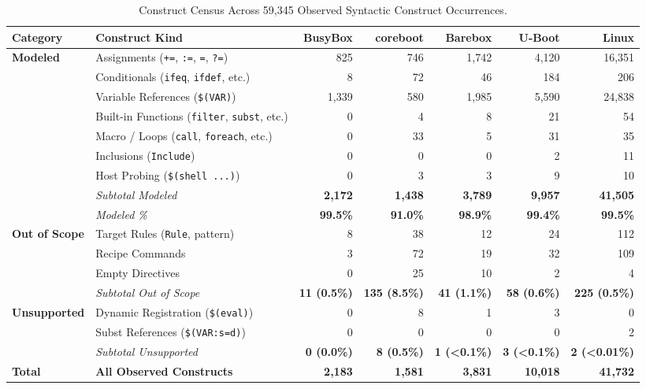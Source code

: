 \documentclass[acmsmall,screen,review]{acmart}
\begin{document}
\begin{table}[t]
\centering
\footnotesize
\setlength{\tabcolsep}{3pt}
\caption{Construct Census Across 59,345 Observed Syntactic Construct Occurrences.}
\label{tab:rq2}
\begin{tabular}{llrrrrr}
\toprule
\textbf{Category} & \textbf{Construct Kind} & \textbf{BusyBox} & \textbf{coreboot} & \textbf{Barebox} & \textbf{U-Boot} & \textbf{Linux} \\
\midrule
\textbf{Modeled} & Assignments (\texttt{+=}, \texttt{:=}, \texttt{=}, \texttt{?=}) & 825 & 746 & 1,742 & 4,120 & 16,351 \\
& Conditionals (\texttt{ifeq}, \texttt{ifdef}, etc.) & 8 & 72 & 46 & 184 & 206 \\
& Variable References (\texttt{\$(VAR)}) & 1,339 & 580 & 1,985 & 5,590 & 24,838 \\
& Built-in Functions (\texttt{filter}, \texttt{subst}, etc.) & 0 & 4 & 8 & 21 & 54 \\
& Macro / Loops (\texttt{call}, \texttt{foreach}, etc.) & 0 & 33 & 5 & 31 & 35 \\
& Inclusions (\texttt{Include}) & 0 & 0 & 0 & 2 & 11 \\
& Host Probing (\texttt{\$(shell ...)}) & 0 & 3 & 3 & 9 & 10 \\
\cmidrule(lr){2-7}
& \emph{Subtotal Modeled} & \textbf{2,172} & \textbf{1,438} & \textbf{3,789} & \textbf{9,957} & \textbf{41,505} \\
& \emph{Modeled \%} & \textbf{99.5\%} & \textbf{91.0\%} & \textbf{98.9\%} & \textbf{99.4\%} & \textbf{99.5\%} \\
\midrule
\textbf{Out of Scope} & Target Rules (\texttt{Rule}, pattern) & 8 & 38 & 12 & 24 & 112 \\
& Recipe Commands & 3 & 72 & 19 & 32 & 109 \\
& Empty Directives & 0 & 25 & 10 & 2 & 4 \\
\cmidrule(lr){2-7}
& \emph{Subtotal Out of Scope} & \textbf{11 (0.5\%)} & \textbf{135 (8.5\%)} & \textbf{41 (1.1\%)} & \textbf{58 (0.6\%)} & \textbf{225 (0.5\%)} \\
\midrule
\textbf{Unsupported} & Dynamic Registration (\texttt{\$(eval)}) & 0 & 8 & 1 & 3 & 0 \\
& Subst References (\texttt{\$(VAR:s=d)}) & 0 & 0 & 0 & 0 & 2 \\
\cmidrule(lr){2-7}
& \emph{Subtotal Unsupported} & \textbf{0 (0.0\%)} & \textbf{8 (0.5\%)} & \textbf{1 (<0.1\%)} & \textbf{3 (<0.1\%)} & \textbf{2 (<0.01\%)} \\
\midrule
\textbf{Total} & \textbf{All Observed Constructs} & \textbf{2,183} & \textbf{1,581} & \textbf{3,831} & \textbf{10,018} & \textbf{41,732} \\
\bottomrule
\end{tabular}
\end{table}
\end{document}
